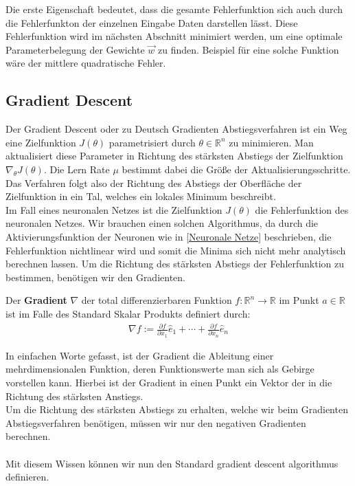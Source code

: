 Die erste Eigenschaft bedeutet, dass die gesamte Fehlerfunktion 
sich auch durch die Fehlerfunkton der einzelnen Eingabe Daten darstellen lässt.
Diese Fehlerfunktion wird im nächsten Abschnitt minimiert werden, um
eine optimale Parameterbelegung der Gewichte $\vec{w}$ zu finden. 
Beispiel für eine solche Funktion wäre der 
mittlere quadratische Fehler.

\subsection{Gradient Descent}\label{Gradient Descent}

Der Gradient Descent oder zu Deutsch Gradienten Abstiegsverfahren
ist ein Weg eine Zielfunktion $J(\theta)$ parametrisiert durch $\theta \in \mathbb{R}^n$
zu minimieren. Man aktualisiert diese Parameter in Richtung des stärksten Abstiegs
der Zielfunktion $\nabla_\theta J(\theta)$. Die Lern Rate $\mu$ bestimmt
dabei die Größe der Aktualisierungsschritte. Das Verfahren folgt 
also der Richtung des Abstiegs der Oberfläche der Zielfunktion in ein Tal,
welches ein lokales Minimum
beschreibt. \cite[Kapitel 1]{Ruder.9152016} \\

Im Fall eines neuronalen Netzes ist die Zielfunktion $J(\theta)$ die
Fehlerfunktion des neuronalen Netzes. 
Wir brauchen einen solchen Algorithmus, da durch die Aktivierungsfunktion der Neuronen
wie in \ref{Neuronale Netze} beschrieben, die Fehlerfunktion nichtlinear wird und somit
die Minima sich nicht mehr analytisch berechnen lassen.
Um die Richtung des stärksten Abstiegs der Fehlerfunktion zu bestimmen, benötigen
wir den Gradienten.


\begin{definition}
    \cite{Konigsberger.2002}
    Der \textbf{Gradient} $\nabla$ der total differenzierbaren Funktion
    $f:\mathbb{R}^n \rightarrow \mathbb{R}$ im Punkt $a\in\mathbb{R}$ ist im
    Falle des Standard Skalar Produkts definiert durch:
    \begin{align}
        \nabla f := \frac{\partial f}{\partial x_{1}}\hat{e}_{1}+\cdots+\frac{\partial f}{\partial x_{n}}\hat{e}_{n}
    \end{align}
\end{definition}

In einfachen Worte gefasst, ist der Gradient die Ableitung einer mehrdimensionalen
Funktion, deren Funktionswerte man sich als Gebirge vorstellen kann.
Hierbei ist der Gradient in einen Punkt ein Vektor der in die Richtung des 
stärksten Anstiegs. \\
Um die Richtung des stärksten Abstiegs zu erhalten, welche wir beim Gradienten
Abstiegsverfahren benötigen, müssen wir nur den negativen Gradienten berechnen. \\\\
Mit diesem Wissen können wir nun den Standard gradient descent algorithmus definieren.

